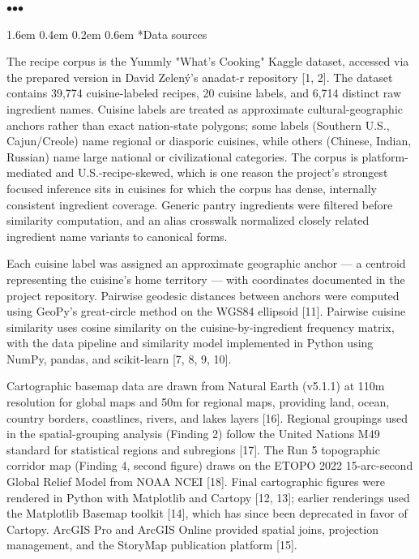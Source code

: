 \documentclass[11pt]{article}
\makeatletter
\renewcommand\section{\@startsection{section}{1}{\z@}%
  {1.6em \@plus 0.4em \@minus 0.2em}%
  {0.6em}%
  {\normalfont\Large\bfseries\color{black!85}}}
\newcommand{\sectionbreak}{%
  \par\nobreak\vspace{0.8em}%
  \par\centerline{\textcolor{black!40}{$\bullet$\quad$\bullet$\quad$\bullet$}}%
  \par\vspace{0.6em}\nobreak%
}
\makeatother
\begin{document}
\sectionbreak


\section*{Data sources}


The recipe corpus is the Yummly "What's Cooking" Kaggle dataset, accessed via the prepared version in David Zelený's anadat-r repository [1, 2]. The dataset contains 39,774 cuisine-labeled recipes, 20 cuisine labels, and 6,714 distinct raw ingredient names. Cuisine labels are treated as approximate cultural-geographic anchors rather than exact nation-state polygons; some labels (Southern U.S., Cajun/Creole) name regional or diasporic cuisines, while others (Chinese, Indian, Russian) name large national or civilizational categories. The corpus is platform-mediated and U.S.-recipe-skewed, which is one reason the project's strongest focused inference sits in cuisines for which the corpus has dense, internally consistent ingredient coverage. Generic pantry ingredients were filtered before similarity computation, and an alias crosswalk normalized closely related ingredient name variants to canonical forms.


Each cuisine label was assigned an approximate geographic anchor — a centroid representing the cuisine's home territory — with coordinates documented in the project repository. Pairwise geodesic distances between anchors were computed using GeoPy's great-circle method on the WGS84 ellipsoid [11]. Pairwise cuisine similarity uses cosine similarity on the cuisine-by-ingredient frequency matrix, with the data pipeline and similarity model implemented in Python using NumPy, pandas, and scikit-learn [7, 8, 9, 10].


Cartographic basemap data are drawn from Natural Earth (v5.1.1) at 110m resolution for global maps and 50m for regional maps, providing land, ocean, country borders, coastlines, rivers, and lakes layers [16]. Regional groupings used in the spatial-grouping analysis (Finding 2) follow the United Nations M49 standard for statistical regions and subregions [17]. The Run 5 topographic corridor map (Finding 4, second figure) draws on the ETOPO 2022 15-arc-second Global Relief Model from NOAA NCEI [18]. Final cartographic figures were rendered in Python with Matplotlib and Cartopy [12, 13]; earlier renderings used the Matplotlib Basemap toolkit [14], which has since been deprecated in favor of Cartopy. ArcGIS Pro and ArcGIS Online provided spatial joins, projection management, and the StoryMap publication platform [15].
\end{document}
